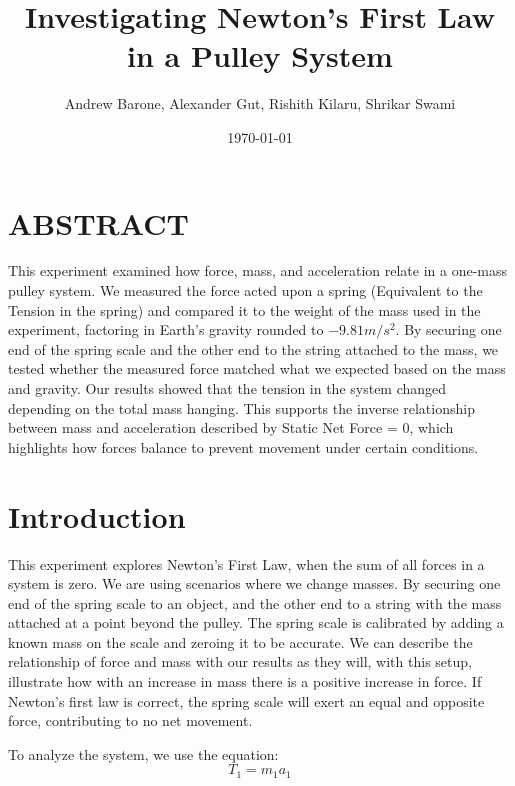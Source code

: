 \documentclass[aps, prl, twocolumn, 10pt]{revtex4-2}
\begin{document}
    \title{Investigating Newton's First Law in a Pulley System}
    \author{Andrew Barone, Alexander Gut, Rishith Kilaru, Shrikar Swami}
    \date{\today}
    \maketitle
    
    
    \section*{ABSTRACT}
    
        This experiment examined how force, mass, and acceleration relate in a one-mass pulley system. We measured the force acted upon a spring (Equivalent to the Tension in the spring) and compared it to the weight of the mass used in the experiment, factoring in Earth's gravity rounded to \(-9.81 m/s^2.\) By securing one end of the spring scale and the other end to the string attached to the mass, we tested whether the measured force matched what we expected based on the mass and gravity. Our results showed that the tension in the system changed depending on the total mass hanging. This supports the inverse relationship between mass and acceleration described by Static Net Force = 0, which highlights how forces balance to prevent movement under certain conditions. 
    
    \section*{Introduction}
        \hrulefill
        
        This experiment explores Newton's First Law, when the sum of all forces in a system is zero. We are using scenarios where we change masses. By securing one end of the spring scale to an object, and the other end to a string with the mass attached at a point beyond the pulley. The spring scale is calibrated by adding a known mass on the scale and zeroing it to be accurate. We can describe the relationship of force and mass with our results as they will, with this setup, illustrate how with an increase in mass there is a positive increase in force. If Newton's first law is correct, the spring scale will exert an equal and opposite force, contributing to no net movement.
    
        To analyze the system, we use the equation:
        \begin{equation}
            T_1 = m_1 a_1
        \end{equation}
        
\end{document}
